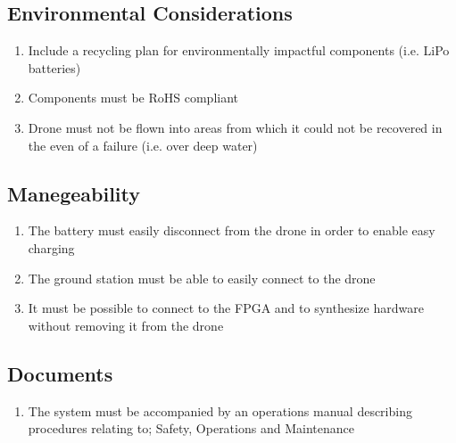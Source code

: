 \documentclass[10pt,letterpaper]{article}
\begin{document}
\subsection{Environmental Considerations}
\begin{enumerate}[{C.EN}.1:]
    \item Include a recycling plan for environmentally impactful components (i.e. LiPo batteries)
    \item Components must be RoHS compliant
    \item Drone must not be flown into areas from which it could not be recovered in the even of a failure (i.e. over deep water)

\end{enumerate}

\subsection{Manegeability}
\begin{enumerate}[{C.EN}.1:]
    \item The battery must easily disconnect from the drone in order to enable easy charging
    \item The ground station must be able to easily connect to the drone
    \item It must be possible to connect to the FPGA and to synthesize hardware without removing it from the drone


\end{enumerate}

\subsection{Documents}
\begin{enumerate}[{C.EN}.1:]
    \item  The system must be accompanied by an operations manual describing procedures relating to; Safety, Operations and Maintenance


\end{enumerate}

\clearpage
{}



\end{document}

